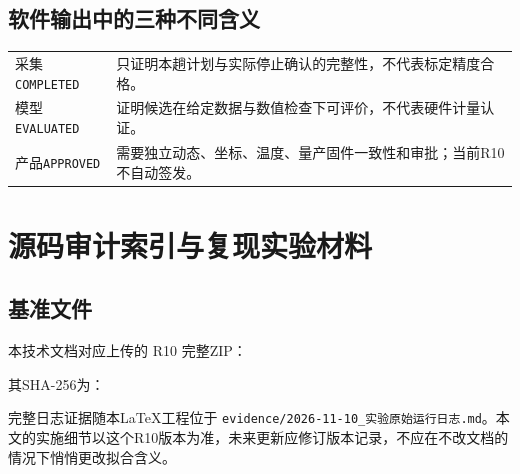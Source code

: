 \documentclass[UTF8,a4paper,11pt,oneside,openany,fontset=none]{ctexbook}
\begin{document}
\section{软件输出中的三种不同含义}
\begin{center}
\begin{tabularx}{\linewidth}{lX}\toprule
采集\texttt{COMPLETED} & 只证明本趟计划与实际停止确认的完整性，不代表标定精度合格。\\
模型\texttt{EVALUATED} & 证明候选在给定数据与数值检查下可评价，不代表硬件计量认证。\\
产品\texttt{APPROVED} & 需要独立动态、坐标、温度、量产固件一致性和审批；当前R10不自动签发。\\\bottomrule
\end{tabularx}
\end{center}

\appendix
\chapter{源码审计索引与复现实验材料}
\section{基准文件}
本技术文档对应上传的 R10 完整ZIP：
\begin{quote}\small\ttfamily{}\end{quote}
其SHA-256为：
\begin{quote}\small\ttfamily{}\end{quote}
完整日志证据随本LaTeX工程位于 \texttt{evidence/2026-11-10\_实验原始运行日志.md}。本文的实施细节以这个R10版本为准，未来更新应修订版本记录，不应在不改文档的情况下悄悄更改拟合含义。
\end{document}
